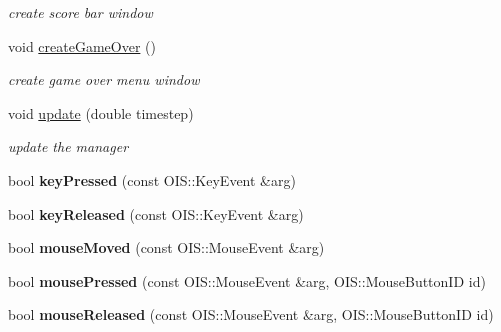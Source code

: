 \begin{DoxyCompactItemize}
\begin{DoxyCompactList}\small\item\em create score bar window \end{DoxyCompactList}\item 
void \hyperlink{class_n_c_t_u_1_1_g_u_i_manager_a62f0a4027d39b623ed4cc765e884a88a}{create\+Game\+Over} ()\hypertarget{class_n_c_t_u_1_1_g_u_i_manager_a62f0a4027d39b623ed4cc765e884a88a}{}\label{class_n_c_t_u_1_1_g_u_i_manager_a62f0a4027d39b623ed4cc765e884a88a}

\begin{DoxyCompactList}\small\item\em create game over menu window \end{DoxyCompactList}\item 
void \hyperlink{class_n_c_t_u_1_1_g_u_i_manager_adf56d01be5e9a6c7e8fc13d193a5557a}{update} (double timestep)\hypertarget{class_n_c_t_u_1_1_g_u_i_manager_adf56d01be5e9a6c7e8fc13d193a5557a}{}\label{class_n_c_t_u_1_1_g_u_i_manager_adf56d01be5e9a6c7e8fc13d193a5557a}

\begin{DoxyCompactList}\small\item\em update the manager \end{DoxyCompactList}\item 
bool {\bfseries key\+Pressed} (const O\+I\+S\+::\+Key\+Event \&arg)\hypertarget{class_n_c_t_u_1_1_g_u_i_manager_a3099cc80b76fa94b31fe0469188e7e99}{}\label{class_n_c_t_u_1_1_g_u_i_manager_a3099cc80b76fa94b31fe0469188e7e99}

\item 
bool {\bfseries key\+Released} (const O\+I\+S\+::\+Key\+Event \&arg)\hypertarget{class_n_c_t_u_1_1_g_u_i_manager_afa2eb93ecd6bd394ebbc5394f9036f4f}{}\label{class_n_c_t_u_1_1_g_u_i_manager_afa2eb93ecd6bd394ebbc5394f9036f4f}

\item 
bool {\bfseries mouse\+Moved} (const O\+I\+S\+::\+Mouse\+Event \&arg)\hypertarget{class_n_c_t_u_1_1_g_u_i_manager_a9318f4168f050acfe12406b5595d8c9a}{}\label{class_n_c_t_u_1_1_g_u_i_manager_a9318f4168f050acfe12406b5595d8c9a}

\item 
bool {\bfseries mouse\+Pressed} (const O\+I\+S\+::\+Mouse\+Event \&arg, O\+I\+S\+::\+Mouse\+Button\+ID id)\hypertarget{class_n_c_t_u_1_1_g_u_i_manager_a9960bf4f629c351066197bc15f0eeb87}{}\label{class_n_c_t_u_1_1_g_u_i_manager_a9960bf4f629c351066197bc15f0eeb87}

\item 
bool {\bfseries mouse\+Released} (const O\+I\+S\+::\+Mouse\+Event \&arg, O\+I\+S\+::\+Mouse\+Button\+ID id)\hypertarget{class_n_c_t_u_1_1_g_u_i_manager_a727096747830570784a970bba633c9d8}{}\label{class_n_c_t_u_1_1_g_u_i_manager_a727096747830570784a970bba633c9d8}


\end{DoxyCompactItemize}
